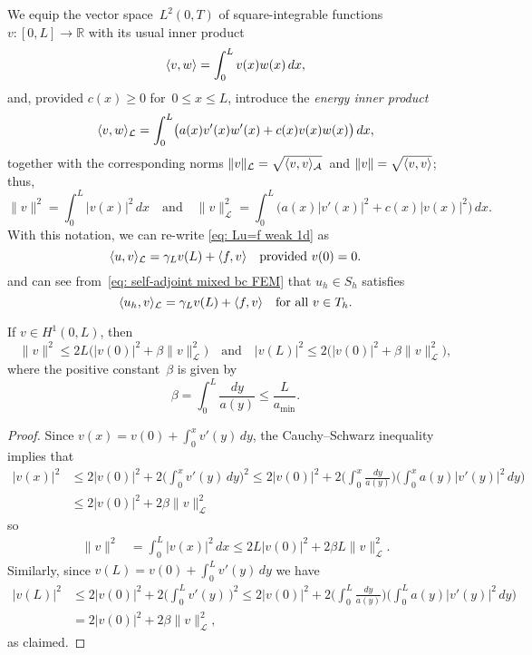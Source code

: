 We equip the vector space~$L^2(0,T)$ of square-integrable 
functions~$v:[0,L]\to\mathbb{R}$ with its usual inner product
\[
\langle v,w\rangle=\int_0^Lv(x)w(x)\,dx,
\]
and, provided $c(x)\ge0$ for~$0\le x\le L$, introduce the \emph{energy
inner product}
\begin{equation}\label{eq: energy iprod}
\langle v,w\rangle_{\mathcal{L}}=\int_0^L\bigl(a(x)v'(x)w'(x)+c(x)v(x)w(x)\bigr)\,dx,
\end{equation}
together with the corresponding norms
$\|v\|_{\mathcal{L}}=\sqrt{\langle v,v\rangle_{\mathcal{A}}}$~and
$\|v\|=\sqrt{\langle v,v\rangle}$; thus,
\[
\|v\|^2=\int_0^L|v(x)|^2\,dx
\quad\text{and}\quad
\|v\|_{\mathcal{L}}^2=\int_0^L\bigl(a(x)|v'(x)|^2+c(x)|v(x)|^2\bigr)\,dx.
\]
With this notation, we can re-write \eqref{eq: Lu=f weak 1d} as
\begin{equation}\label{eq: <u,v>A}
\langle u,v\rangle_{\mathcal{L}}=\gamma_Lv(L)+\langle f,v\rangle\quad\text{provided $v(0)=0$.}
\end{equation}
and can see from~\eqref{eq: self-adjoint mixed bc FEM} that $u_h\in S_h$
satisfies
\begin{equation}\label{eq: <uh,v>A}
\langle u_h,v\rangle_{\mathcal{L}}=\gamma_Lv(L)+\langle f,v\rangle
	\quad\text{for all $v\in T_h$.}
\end{equation}

\begin{lemma}\label{lem: v v'}
If $v\in H^1(0,L)$, then
\[
\|v\|^2\le2L\bigl(|v(0)|^2+\beta\|v\|_{\mathcal{L}}^2\bigr)
\quad\text{and}\quad
|v(L)|^2\le 2\bigl(|v(0)|^2+\beta\|v\|_{\mathcal{L}}^2\bigr),
\]
where the positive constant~$\beta$ is given by
\[
\beta=\int_0^L\frac{dy}{a(y)}\le\frac{L}{a_{\min}}.
\]
\end{lemma}
\begin{proof}
Since $v(x)=v(0)+\int_0^xv'(y)\,dy$, the Cauchy--Schwarz inequality implies that
\begin{align*}
|v(x)|^2&\le2|v(0)|^2+2\biggl(\int_0^x v'(y)\,dy\biggr)^2
\le2|v(0)|^2+2\biggl(\int_0^x\frac{dy}{a(y)}\biggr)
\biggl(\int_0^xa(y)|v'(y)|^2\,dy\biggr)\\
	&\le2|v(0)|^2+2\beta\|v\|_{\mathcal{L}}^2
\end{align*}
so
\begin{align*}
\|v\|^2&=\int_0^L|v(x)|^2\,dx\le 2L|v(0)|^2+2\beta L\|v\|_{\mathcal{L}}^2.
\end{align*}
Similarly, since $v(L)=v(0)+\int_0^Lv'(y)\,dy$ we have
\begin{align*}
|v(L)|^2&\le2|v(0)|^2+2\biggl(\int_0^Lv'(y)\,\biggr)^2
	\le2|v(0)|^2+2\biggl(\int_0^L\frac{dy}{a(y)}\biggr)
	\biggl(\int_0^La(y)|v'(y)|^2\,dy\biggr)\\
	&=2|v(0)|^2+2\beta\|v\|_{\mathcal{L}}^2,
\end{align*}
as claimed.
\end{proof}

